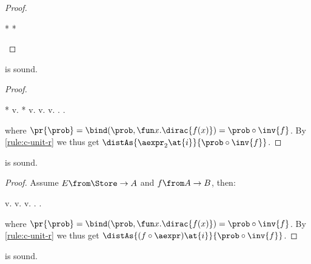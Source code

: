 \documentclass[acmsmall,nonacm,screen,appendix]{acmart}
\begin{document}
\begin{proof}
\begin{eqexplain}
  *
\whichproves*
  *
\whichproves
  \land
\whichproves
\whichproves
\qedhere
\end{eqexplain}
\end{proof} \begin{lemma}
\label{proof:sure-sub}
   is sound.
\end{lemma}

\begin{proof}
  \begin{eqexplain}
    *
  \whichproves*
    \CC\prob v.
      *
\whichproves
    \CC\prob v.
\whichproves
    \CC\prob v. 
\whichproves
    \CC\prob v.  .
\whichproves
    \CC{\pr{\prob}} .
  \end{eqexplain}
  where $\pr{\prob} = \bind(\prob, \fun x. \dirac{f(x)}) = \prob \circ \inv{f}$.
  By \ref{rule:c-unit-r} we thus get
  $\distAs{\aexpr_2\at{i}}{\prob \circ \inv{f}}$.
\end{proof} \begin{lemma}
\label{proof:dist-fun}
   is sound.
\end{lemma}

\begin{proof}
  Assume $E\from \Store \to A$ and $ f \from A \to B $, then:
  \begin{eqexplain}
\whichproves*
      \CC\prob v. 
\whichproves
      \CC\prob v. 
\whichproves
      \CC\prob v.  .
\whichproves
      \CC{\pr{\prob}} .
  \end{eqexplain}
  where $\pr{\prob} = \bind(\prob, \fun x. \dirac{f(x)}) = \prob \circ \inv{f}$.
  By \ref{rule:c-unit-r} we thus get
  $\distAs{(f\circ\aexpr)\at{i}}{\prob \circ \inv{f}}$.
\end{proof} \begin{lemma}
\label{proof:dirac-dup}
   is sound.
\end{lemma}
\end{document}
